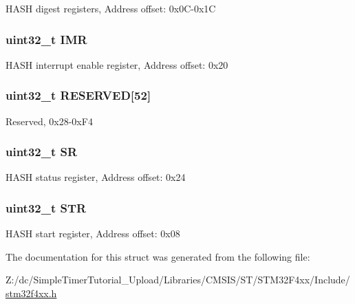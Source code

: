 H\-A\-S\-H digest registers, Address offset\-: 0x0\-C-\/0x1\-C \hypertarget{struct_h_a_s_h___type_def_ae845b86e973b4bf8a33c447c261633f6}{
\subsubsection[{I\-M\-R}]{ uint32\-\_\-t I\-M\-R}}\label{struct_h_a_s_h___type_def_ae845b86e973b4bf8a33c447c261633f6}
H\-A\-S\-H interrupt enable register, Address offset\-: 0x20 \hypertarget{struct_h_a_s_h___type_def_a31675cbea6dc1b5f7de162884a4bb6eb}{
\subsubsection[{R\-E\-S\-E\-R\-V\-E\-D}]{\setlength{\rightskip}{0pt plus 5cm}uint32\-\_\-t R\-E\-S\-E\-R\-V\-E\-D\mbox{[}52\mbox{]}}}\label{struct_h_a_s_h___type_def_a31675cbea6dc1b5f7de162884a4bb6eb}
Reserved, 0x28-\/0x\-F4 \hypertarget{struct_h_a_s_h___type_def_af6aca2bbd40c0fb6df7c3aebe224a360}{
\subsubsection[{S\-R}]{ uint32\-\_\-t S\-R}}\label{struct_h_a_s_h___type_def_af6aca2bbd40c0fb6df7c3aebe224a360}
H\-A\-S\-H status register, Address offset\-: 0x24 \hypertarget{struct_h_a_s_h___type_def_a7060ac1ed928ee931d7664650f2dcf75}{
\subsubsection[{S\-T\-R}]{ uint32\-\_\-t S\-T\-R}}\label{struct_h_a_s_h___type_def_a7060ac1ed928ee931d7664650f2dcf75}
H\-A\-S\-H start register, Address offset\-: 0x08 

The documentation for this struct was generated from the following file\-:\begin{DoxyCompactItemize}
\item 
Z\-:/dc/\-Simple\-Timer\-Tutorial\-\_\-\-Upload/\-Libraries/\-C\-M\-S\-I\-S/\-S\-T/\-S\-T\-M32\-F4xx/\-Include/\hyperlink{stm32f4xx_8h}{stm32f4xx.\-h}\end{DoxyCompactItemize}
